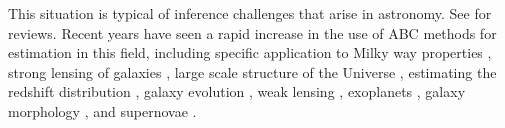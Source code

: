 \documentclass[12pt]{article}
\newcommand{\jessi}[1]{{\color{blue}[[\textbf{Jessi: }#1]]}}
\begin{document}
%
%
This situation is typical of inference challenges that arise in astronomy. See
\cite{schafer2012, AkeretEtAl2015, IshidaEtAl2015} for reviews.
Recent years have seen a
rapid increase in the use of ABC methods for estimation in this field, including
specific application to 
Milky way properties \citep{RobinEtAl2014},
strong lensing of galaxies \citep{Killedar2018,Birrer2017},
large scale structure of the Universe \citep{Hahn2017b},
estimating the redshift distribution \citep{Herbel2017},
galaxy evolution \citep{Hahn2017a},
weak lensing \citep{Peel2017,Lin2015},
exoplanets \citep{Parker2015},
galaxy morphology \citep{CameronPettitt2012},
and
supernovae \citep{WeyantEtAl2013}.
\end{document}
